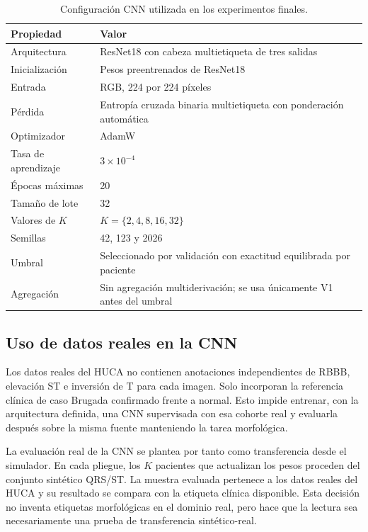 \begin{table}[H]
  \centering
  \small
  \begin{tabularx}{0.92\textwidth}{p{4cm}X}
    \toprule
    Propiedad & Valor \\
    \midrule
    Arquitectura & ResNet18 con cabeza multietiqueta de tres salidas \\
    Inicialización & Pesos preentrenados de ResNet18 \\
    Entrada & RGB, 224 por 224 píxeles \\
    Pérdida & Entropía cruzada binaria multietiqueta con ponderación automática \\
    Optimizador & AdamW \\
    Tasa de aprendizaje & \(3\times10^{-4}\) \\
    Épocas máximas & 20 \\
    Tamaño de lote & 32 \\
    Valores de \(K\) & \(K=\{2,4,8,16,32\}\) \\
    Semillas & 42, 123 y 2026 \\
    Umbral & Seleccionado por validación con exactitud equilibrada por paciente \\
    Agregación & Sin agregación multiderivación; se usa únicamente V1 antes del umbral \\
    \bottomrule
  \end{tabularx}
  \caption{Configuración CNN utilizada en los experimentos finales.}
  \label{tab:modelo_cnn_final}
\end{table}

\subsection{Uso de datos reales en la CNN}

Los datos reales del HUCA no contienen anotaciones independientes de RBBB, elevación ST e inversión de T para cada imagen. Solo incorporan la referencia clínica de caso Brugada confirmado frente a normal. Esto impide entrenar, con la arquitectura definida, una CNN supervisada con esa cohorte real y evaluarla después sobre la misma fuente manteniendo la tarea morfológica.

La evaluación real de la CNN se plantea por tanto como transferencia desde el simulador. En cada pliegue, los \(K\) pacientes que actualizan los pesos proceden del conjunto sintético QRS/ST. La muestra evaluada pertenece a los datos reales del HUCA y su resultado se compara con la etiqueta clínica disponible. Esta decisión no inventa etiquetas morfológicas en el dominio real, pero hace que la lectura sea necesariamente una prueba de transferencia sintético-real.

